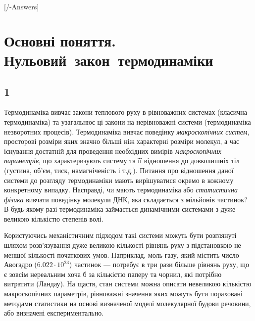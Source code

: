 
[\currfilebase/\currfilebase-Answers]
\chapter{Основні поняття. \mbox{Нульовий закон термодинаміки}}\label{\currfilebase}
\makeatletter
{}
\makeatother







\section{1}


Термодинаміка вивчає закони теплового руху в рівноважних системах (класична термодинаміка) та узагальнює ці закони на нерівноважні системи (термодинаміка незворотних процесів). Термодинаміка вивчає поведінку \emph{макроскопічних систем}, просторові розміри яких значно більші ніж характерні розміри молекул, а час існування достатній для проведення необхідних вимірів \emph{макроскопічних параметрів}, що характеризують систему та її відношення до довколишніх тіл (густина, об'єм, тиск, намагніченість і т.д.). Питання про відношення даної системи до розгляду термодинаміки мають вирішуватися окремо в кожному конкретному випадку. Насправді, чи мають термодинаміка або\emph{ статистична фізика}  вивчати поведінку молекули ДНК, яка складається з мільйонів частинок? В будь-якому разі термодинаміка займається динамічними системами з дуже великою кількістю степенів волі.

Користуючись механістичним підходом такі системи можуть бути розглянуті шляхом розв'язування дуже великою кількості рівнянь руху з підстановкою не меншої кількості початкових умов. Наприклад, моль газу, який містить число Авогадро ($ 6.022\cdot10^{23} $) частинок --- потребує в три рази більше рівнянь руху, що є зовсім нереальним хоча б за кількістю паперу та чорнил, які потрібно витратити (Ландау). На щастя, стан системи можна описати невеликою кількістю макроскопічних параметрів, рівноважні значення яких можуть бути пораховані методами статистики на основі визначеної моделі молекулярної будови речовини, або визначені експериментально.

